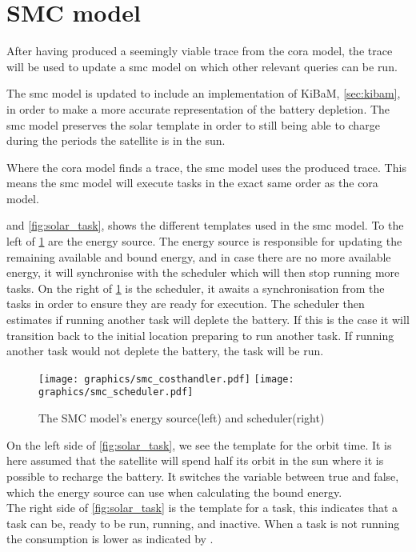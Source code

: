 \section{SMC model}
After having produced a seemingly viable trace from the \gls{cora} model, the trace will be used to update a \gls{smc} model on which other relevant queries can be run.

The \gls{smc} model is updated to include an implementation of KiBaM, \cref{sec:kibam}, in order to make a more accurate representation of the battery depletion. The \gls{smc} model preserves the solar template in order to still being able to charge during the periods the satellite is in the sun.

Where the \gls{cora} model finds a trace, the \gls{smc} model uses the produced trace. This means the \gls{smc} model will execute tasks in the exact same order as the \gls{cora} model.%

 and \cref{fig:solar_task}, shows the different templates used in the \gls{smc} model. To the left of \cref{fig:cost_schedule} are the energy source. The energy source is responsible for updating the remaining available and bound energy, and in case there are no more available energy, it will synchronise with the scheduler which will then stop running more tasks.
On the right of \cref{fig:cost_schedule} is the scheduler, it awaits a synchronisation from the tasks in order to ensure they are ready for execution. The scheduler then estimates if running another task will deplete the battery. If this is the case it will transition back to the initial location preparing to run another task. If running another task would not deplete the battery, the task will be run.

\begin{figure}[H]%
	\centering
	\subfloat
	{{\texttt{[image: graphics/smc\_costhandler.pdf]} }}%
	\qquad
	\subfloat
	{{\texttt{[image: graphics/smc\_scheduler.pdf]} }}%
	\caption{The SMC model's energy source(left) and scheduler(right)}%
	\label{fig:cost_schedule}%
\end{figure}

On the left side of \cref{fig:solar_task}, we see the template for the orbit time. It is here assumed that the satellite will spend half its orbit in the sun where it is possible to recharge the battery. It switches the variable  between true and false, which the energy source can use when calculating the bound energy.\\
The right side of \cref{fig:solar_task} is the template for a task, this indicates that a task can be, ready to be run, running, and inactive. When a task is not running the consumption is lower as indicated by .

